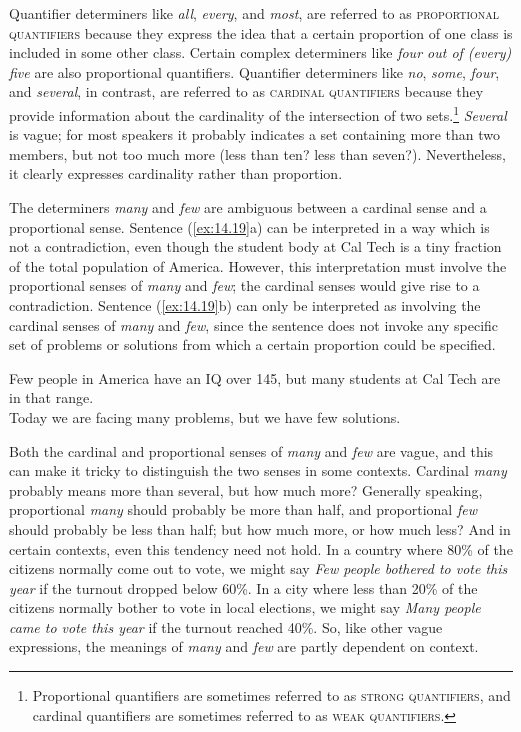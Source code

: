 Quantifier determiners like \textit{all}, \textit{every}, and \textit{most}, are referred to as \textsc{proportional quantifiers} because they express the idea that a certain proportion of one class is included in some other class. Certain complex determiners like \textit{four out of (every) five} are also proportional quantifiers. Quantifier determiners like \textit{no}, \textit{some}, \textit{four}, and \textit{several}, in contrast, are referred to as \textsc{cardinal quantifiers} because they provide information about the cardinality of the intersection of two sets.\footnote{Proportional quantifiers are sometimes referred to as \textsc{strong} \textsc{quantifiers}, and cardinal quantifiers are sometimes referred to as \textsc{weak} \textsc{quantifiers}.} \textit{Several} is vague; for most speakers it probably indicates a set containing more than two members, but not too much more (less than ten? less than seven?). Nevertheless, it clearly expresses cardinality rather than proportion.



The determiners \textit{many} and \textit{few} are ambiguous between a cardinal sense and a proportional sense. Sentence (\ref{ex:14.19}a) can be interpreted in a way which is not a contradiction, even though the student body at Cal Tech is a tiny fraction of the total population of America. However, this interpretation must involve the proportional senses of \textit{many} and \textit{few}; the cardinal senses would give rise to a contradiction. Sentence (\ref{ex:14.19}b) can only be interpreted as involving the cardinal senses of \textit{many} and \textit{few}, since the sentence does not invoke any specific set of problems or solutions from which a certain proportion could be specified.


\ea \label{ex:14.19}
\ea Few people in America have an IQ over 145, but many students at Cal Tech are in that range.\\
\ex Today we are facing many problems, but we have few solutions.
     \z
\z


Both the cardinal and proportional senses of \textit{many} and \textit{few} are vague, and this can make it tricky to distinguish the two senses in some contexts. Cardinal \textit{many} probably means more than several, but how much more? Generally speaking, proportional \textit{many} should probably be more than half, and proportional \textit{few} should probably be less than half; but how much more, or how much less? And in certain contexts, even this tendency need not hold. In a country where 80\% of the citizens normally come out to vote, we might say \textit{Few people bothered to vote this year} if the turnout dropped below 60\%. In a city where less than 20\% of the citizens normally bother to vote in local elections, we might say \textit{Many people came to vote this year} if the turnout reached 40\%. So, like other vague expressions, the meanings of \textit{many} and \textit{few} are partly dependent on context.

